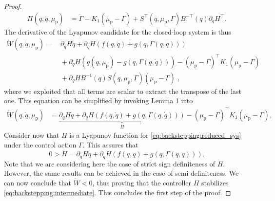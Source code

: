 \begin{proof}
\begin{equation*}
\begin{split}
			\Pi(q,\dot{q},\mu_\mathrm{p}) &= \dot{\Gamma} - K_1 (\mu_\mathrm{p} - \Gamma) + S^{\top}(q,\mu_\mathrm{p},\Gamma)B^{-\top}(q)\partial_{\dot{q}} H^{\top}.
		\end{split}
	\end{equation*}
	The derivative of the Lyapunov candidate for the closed-loop system is thus
	\begin{equation*}
	\begin{split}
	\dot{W}(q,\dot{q},\mu_\mathrm{p}) =& \: \partial_{q} H \dot{q} + \partial_{\dot{q}} H (f(q,\dot{q}) + g(q,\Gamma(q,\dot{q}))) \\
	&\: + \partial_{\dot{q}} H (g(q,\mu_\mathrm{p}) - g(q,\Gamma(q,\dot{q}))) - (\mu_\mathrm{p} - \Gamma)^{\top}K_1(\mu_\mathrm{p} - \Gamma) \\
	&\: +  \partial_{\dot{q}} H B^{-1}(q) S(q,\mu_\mathrm{p},\Gamma) (\mu_\mathrm{p} - \Gamma)\;,
	\end{split}
	\end{equation*}
	where we exploited that all terms are scalar to extract the transpose of the last one. This equation can be  simplified by invoking Lemma 1 into
	\begin{equation}
	\begin{split}
	\dot{W}(q,\dot{q},\mu_\mathrm{p}) &=  \underbrace{\partial_{q} H \dot{q} + \partial_{\dot{q}} H (f(q,\dot{q}) + g(q,\Gamma(q,\dot{q})))}_{\dot{H}} - (\mu_\mathrm{p} - \Gamma)^{\top}K_1(\mu_\mathrm{p} - \Gamma).
	\end{split}
	\end{equation}
	Consider now that $H$ is a Lyapunov function for \eqref{eq:backstepping:reduced_sys} under the control action $\Gamma$. This assures that
	\begin{equation}
		0 > \dot{H} = \partial_{q} H \dot{q} + \partial_{\dot{q}} H (f(q,\dot{q}) + g(q,\Gamma(q,\dot{q}))).
	\end{equation}
	Note that we are considering here the case of strict sign definiteness of $\dot{H}$. However, the same results can be achieved in the case of semi-definiteness.
	We can now conclude that $\dot{W} < 0$, thus proving that the controller $\Pi$ stabilizes \eqref{eq:backstepping:intermediate}. This concludes the first step of the proof.
	

\end{proof}
